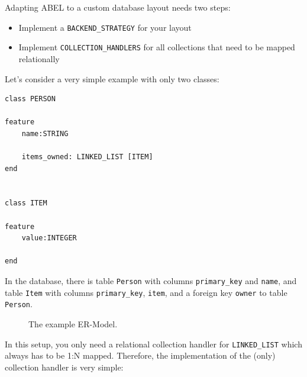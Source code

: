 Adapting ABEL to a custom database layout needs two steps:
 \begin{itemize}
  \item Implement a \lstinline!BACKEND_STRATEGY! for your layout
  \item Implement \lstinline!COLLECTION_HANDLERS! for all collections that need to be mapped relationally
 \end{itemize}

Let's consider a very simple example with only two classes:

\begin{lstlisting}[language=OOSC2Eiffel, captionpos=b, caption={Example classes}, label={lst:example_application}]
class PERSON

feature
	name:STRING

	items_owned: LINKED_LIST [ITEM]
end


class ITEM

feature
	value:INTEGER

end
\end{lstlisting}

In the database, there is table \lstinline!Person! with columns \lstinline!primary_key! and \lstinline!name!, 
and table \lstinline!Item! with columns \lstinline!primary_key!, \lstinline!item!, and a foreign key \lstinline!owner! to table \lstinline!Person!.


\begin{figure} [h!]
\centering
{}
\caption{The example ER-Model.}
\label{fig:er_model_example}
\end{figure}

In this setup, you only need a relational collection handler for \lstinline!LINKED_LIST! which always has to be 1:N mapped.
Therefore, the implementation of the (only) collection handler is very simple:

